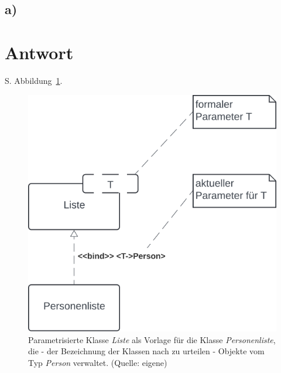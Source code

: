 \subsection*{a)}

\section*{Antwort}

S. Abbildung~\ref{fig:aufgabe-4-teil-a}.\\

\begin{figure}
    \centering
    \includegraphics[scale=0.5]{chapters/aufgabe 4/img/aufgabe4a}
    \caption{Parametrisierte Klasse \textit{Liste} als Vorlage für die Klasse \textit{Personenliste}, die - der Bezeichnung der Klassen nach zu urteilen - Objekte vom Typ \textit{Person} verwaltet. (Quelle: eigene)}
    \label{fig:aufgabe-4-teil-a}
\end{figure}